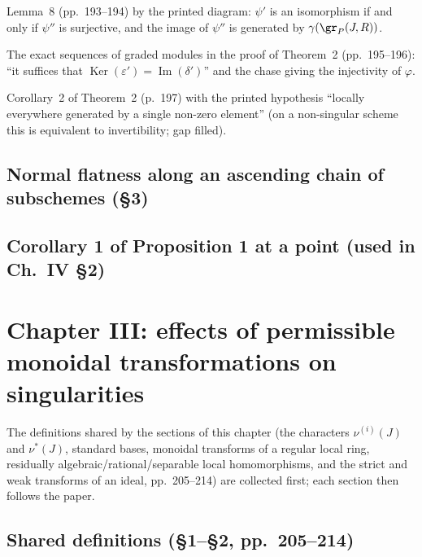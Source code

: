 Lemma~8 (pp.~193--194) by the printed diagram: $\psi'$ is an isomorphism if and only if $\psi''$ is surjective, and the
image of $\psi''$ is generated by $\gamma(\gr_P(J,R))$.

The exact sequences of graded modules in the proof of Theorem~2 (pp.~195--196): ``it suffices that
$\operatorname{Ker}(\varepsilon')=\operatorname{Im}(\delta')$'' and the chase giving the injectivity of $\varphi$.


Corollary~2 of Theorem~2 (p.~197) with the printed hypothesis ``locally everywhere generated by a single non-zero element''
(on a non-singular scheme this is equivalent to invertibility; gap filled).


\section{Normal flatness along an ascending chain of subschemes (\S3)}

\section{Corollary 1 of Proposition 1 at a point (used in Ch.~IV \S2)}

\chapter{Chapter III: effects of permissible monoidal transformations on singularities}

The definitions shared by the sections of this chapter (the characters $\nu^{(i)}(J)$ and
$\nu^*(J)$, standard bases, monoidal transforms of a regular local ring, residually
algebraic/rational/separable local homomorphisms, and the strict and weak transforms of an
ideal, pp.~205--214) are collected first; each section then follows the paper.

\section{Shared definitions (\S1--\S2, pp.~205--214)}

